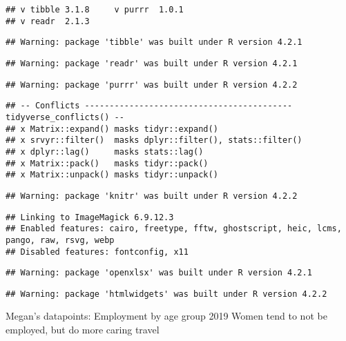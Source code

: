\documentclass[
  12pt,
]{article}
\begin{document}
\begin{verbatim}
## v tibble 3.1.8     v purrr  1.0.1
## v readr  2.1.3
\end{verbatim}

\begin{verbatim}
## Warning: package 'tibble' was built under R version 4.2.1
\end{verbatim}

\begin{verbatim}
## Warning: package 'readr' was built under R version 4.2.1
\end{verbatim}

\begin{verbatim}
## Warning: package 'purrr' was built under R version 4.2.2
\end{verbatim}

\begin{verbatim}
## -- Conflicts ------------------------------------------ tidyverse_conflicts() --
## x Matrix::expand() masks tidyr::expand()
## x srvyr::filter()  masks dplyr::filter(), stats::filter()
## x dplyr::lag()     masks stats::lag()
## x Matrix::pack()   masks tidyr::pack()
## x Matrix::unpack() masks tidyr::unpack()
\end{verbatim}

\begin{verbatim}
## Warning: package 'knitr' was built under R version 4.2.2
\end{verbatim}

\begin{verbatim}
## Linking to ImageMagick 6.9.12.3
## Enabled features: cairo, freetype, fftw, ghostscript, heic, lcms, pango, raw, rsvg, webp
## Disabled features: fontconfig, x11
\end{verbatim}

\begin{verbatim}
## Warning: package 'openxlsx' was built under R version 4.2.1
\end{verbatim}

\begin{verbatim}
## Warning: package 'htmlwidgets' was built under R version 4.2.2
\end{verbatim}

Megan's datapoints: Employment by age group 2019 Women tend to not be
employed, but do more caring travel
\end{document}
